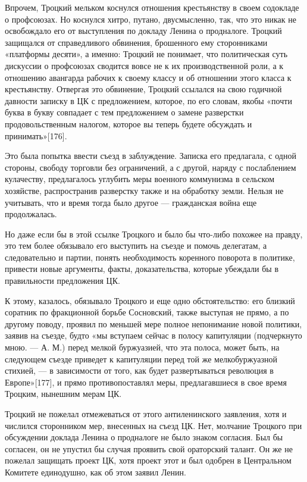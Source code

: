 \documentclass[12pt, a4paper, openany]{book}
\begin{document}
Впрочем, Троцкий мельком коснулся отношения крестьянству в своем содокладе о профсоюзах. Но коснулся хитро, путано, двусмысленно, так, что это никак не освобождало его от выступления по докладу Ленина о продналоге. Троцкий защищался от справедливого обвинения, брошенного ему сторонниками «платформы десяти», а именно: Троцкий не понимает, что политическая суть дискуссии о профсоюзах сводится вовсе не к их производственной роли, а к отношению авангарда рабочих к своему классу и об отношении этого класса к крестьянству. Отвергая это обвинение, Троцкий ссылался на свою годичной давности записку в ЦК с предложением, которое, по его словам, якобы «почти буква в букву совпадает с тем предложением о замене разверстки продовольственным налогом, которое вы теперь будете обсуждать и принимать»[176].

Это была попытка ввести съезд в заблуждение. Записка его предлагала, с одной стороны, свободу торговли без ограничений, а с другой, наряду с послаблением кулачеству, предлагалось углубить меры военного коммунизма в сельском хозяйстве, распространив разверстку также и на обработку земли. Нельзя не учитывать, что и время тогда было другое — гражданская война еще продолжалась.

Но даже если бы в этой ссылке Троцкого и было бы что-либо похожее на правду, это тем более обязывало его выступить на съезде и помочь делегатам, а следовательно и партии, понять необходимость коренного поворота в политике, привести новые аргументы, факты, доказательства, которые убеждали бы в правильности предложения ЦК.

К этому, казалось, обязывало Троцкого и еще одно обстоятельство: его близкий соратник по фракционной борьбе Сосновский, также выступая не прямо, а по другому поводу, проявил по меньшей мере полное непонимание новой политики, заявив на съезде, будто «мы вступаем сейчас в полосу капитуляции (подчеркнуто мною. — А. М.) перед мелкой буржуазией, что эта полоса, может быть, на следующем съезде приведет к капитуляции перед той же мелкобуржуазной стихией, — в зависимости от того, как будет развертываться революция в Европе»[177], и прямо противопоставлял меры, предлагавшиеся в свое время Троцким, нынешним мерам ЦК.

Троцкий не пожелал отмежеваться от этого антиленинского заявления, хотя и числился сторонником мер, внесенных на съезд ЦК. Нет, молчание Троцкого при обсуждении доклада Ленина о продналоге не было знаком согласия. Был бы согласен, он не упустил бы случая проявить свой ораторский талант. Он же не пожелал защищать проект ЦК, хотя проект этот и был одобрен в Центральном Комитете единодушно, как об этом заявил Ленин.
\end{document}
